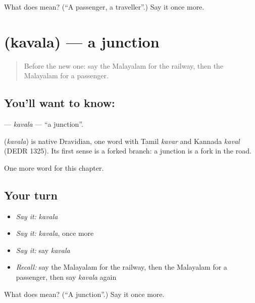 \begin{tcolorbox}[breakable,colback=teal!4,colframe=teal!35!black,title={Before you move on}]
What does  mean? (\textquotedblleft{}A passenger, a traveller\textquotedblright{}.) Say it once more.
\end{tcolorbox}
\section[\texorpdfstring{\ml{കവല} (kavala)}{കവല (kavala)}]{ (kavala) — a junction}

\label{lesson:ML-C238-kavala}



\begin{quote}
Before the new one: say the Malayalam for the railway, then the Malayalam for a passenger.
\end{quote}

\subsection*{You'll want to know: }
\textbf{} — \emph{kavala} — \textquotedblleft{}a junction\textquotedblright{}.

\begin{cousinweb}
\textbf{} (\emph{kavala}) is native Dravidian, one word with Tamil \emph{kavar} and Kannada \emph{kaval} (DEDR 1325). Its first sense is a forked branch: a junction is a fork in the road.
\end{cousinweb}

\begin{grammarlens}[title={What you've built}]
One more word for this chapter.
\end{grammarlens}

\subsection*{Your turn}
\begin{itemize}
\raggedright
  \item \emph{Say it:} \emph{kavala}
  \item \emph{Say it:} \emph{kavala}, once more
  \item \emph{Say it:} say \emph{kavala}
  \item \emph{Recall:} say the Malayalam for the railway, then the Malayalam for a passenger, then say \emph{kavala} again
\end{itemize}

\begin{tcolorbox}[breakable,colback=teal!4,colframe=teal!35!black,title={Before you move on}]
What does  mean? (\textquotedblleft{}A junction\textquotedblright{}.) Say it once more.
\end{tcolorbox}
